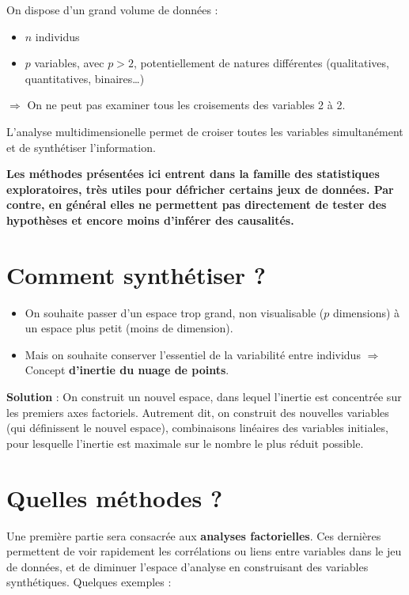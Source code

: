 \documentclass[]{book}
\providecommand{\tightlist}{%
  \setlength{\itemsep}{0pt}\setlength{\parskip}{0pt}}
\begin{document}
On dispose d'un grand volume de données :

\begin{itemize}
\tightlist
\item
  \(n\) individus
\item
  \(p\) variables, avec \(p>2\), potentiellement de natures différentes (qualitatives, quantitatives, binaires\ldots{})
\end{itemize}

\(\Rightarrow\) On ne peut pas examiner tous les croisements des variables 2 à 2.

L'analyse multidimensionelle permet de croiser toutes les variables simultanément et de synthétiser l'information.

\textbf{Les méthodes présentées ici entrent dans la famille des statistiques exploratoires, très utiles pour défricher certains jeux de données. Par contre, en général elles ne permettent pas directement de tester des hypothèses et encore moins d'inférer des causalités. }

\hypertarget{comment-synthetiser}{%
\section{Comment synthétiser ?}\label{comment-synthetiser}}

\begin{itemize}
\tightlist
\item
  On souhaite passer d'un espace trop grand, non visualisable (\(p\) dimensions) à un espace plus petit (moins de dimension).
\item
  Mais on souhaite conserver l'essentiel de la variabilité entre individus \(\Rightarrow\) Concept \textbf{d'inertie du nuage de points}.
\end{itemize}

\textbf{Solution} : On construit un nouvel espace, dans lequel l'inertie est concentrée sur les premiers axes factoriels. Autrement dit, on construit des nouvelles variables (qui définissent le nouvel espace), combinaisons linéaires des variables initiales, pour lesquelle l'inertie est maximale sur le nombre le plus réduit possible.

\hypertarget{quelles-methodes}{%
\section{Quelles méthodes ?}\label{quelles-methodes}}

Une première partie sera consacrée aux \textbf{analyses factorielles}. Ces dernières permettent de voir rapidement les corrélations ou liens entre variables dans le jeu de données, et de diminuer l'espace d'analyse en construisant des variables synthétiques. Quelques exemples :
\end{document}
